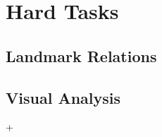 \section{Hard Tasks}

\subsection{Landmark Relations}

\todo{}

\subsection{Visual Analysis}

\todo{}

+

